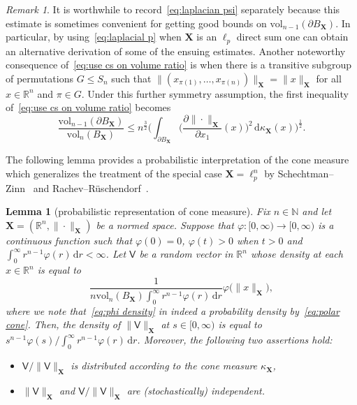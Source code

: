 \documentclass[11pt,reqno]{amsart}
\renewcommand{\le}{\leqslant}
\newcommand{\ud}[0]{\,\mathrm{d}}
\newcommand{\X}{\mathbf X}
\newcommand{\f}{\varphi}
\newcommand{\R}{\mathbb R}
\newtheorem{lemma}[theorem]{Lemma}
\theoremstyle{remark}
\newtheorem{remark}[theorem]{Remark}
\newcommand{\N}{\mathbb N}
\newcommand{\vol}{\mathrm{vol}}
\renewcommand{\1}{\mathbf 1}
\newcommand{\V}{\mathsf{V}}
\begin{document}
\begin{remark}
It is worthwhile to record~\eqref{eq:laplacian psi} separately because this estimate  is sometimes convenient for getting good bounds on  $\vol_{n-1}(\partial B_{\X})$. In particular, by using~\eqref{eq:laplacial p}  when $\X$ is an $\ell_p$ direct sum one can obtain an alternative derivation of some of the ensuing estimates. Another noteworthy consequence of~\eqref{eq:use cs on volume ratio} is when there is a transitive subgroup of permutations $G\le  S_n$ such that $\|(x_{\pi(1)},\ldots,x_{\pi(n)})\|_{\X}=\|x\|_{\X}$ for all $x\in \R^n$ and $\pi\in G$. Under this further symmetry assumption, the first inequality of~\eqref{eq:use cs on volume ratio} becomes
$$
\frac{\vol_{n-1}(\partial B_{\X})}{\vol_n(B_{\X})}\le n^{\frac32} \bigg(\int_{\partial B_{\X}} \bigg(\frac{\partial \|\cdot\|_{\X}}{\partial x_1}(x)\bigg)^2\ud \kappa_{\X}(x) \bigg)^{\frac12}.
$$
\end{remark}





The following lemma provides a probabilistic interpretation of the cone measure  which generalizes the treatment of the special case $\X=\ell_p^n$ by Schechtman--Zinn~\cite{SZ90} and Rachev--R\"uschendorf~\cite{RR91}.

\begin{lemma}[probabilistic representation of  cone measure]\label{lem:generalized cone representtaion} Fix $n\in \N$ and let $\X=(\R^n,\|\cdot \|_{\X})$ be a normed space. Suppose that $\f:[0,\infty)\to [0,\infty)$ is a continuous function such that $\f(0)=0$, $\f(t)>0$ when $t>0$ and $\int_0^\infty r^{n-1}\f(r)\ud r<\infty$. Let $\V$ be a random vector in $\R^n$ whose density at each $x\in \R^n$ is equal to
\begin{equation}\label{eq:phi density}
\frac{1}{n\vol_n(B_{\X})\int_0^\infty r^{n-1}\f(r)\ud r}\f\big(\|x\|_{\X}\big),
\end{equation}
where we note that~\eqref{eq:phi density} in indeed a probability density by~\eqref{eq:polar cone}.  Then, the density of $\|\V\|_{\X}$ at $s\in [0,\infty)$ is equal to $s^{n-1}\f(s)/\int_0^\infty r^{n-1}\f(r)\ud r$. Moreover, the following two assertions hold:
\begin{itemize}
\item $\V/\|\V\|_{\X}$ is distributed according to the cone measure $\kappa_{\X}$,
\item $\|\V\|_{\X}$ and $\V/\|\V\|_{\X}$  are (stochastically) independent.
\end{itemize}
\end{lemma}
\end{document}
